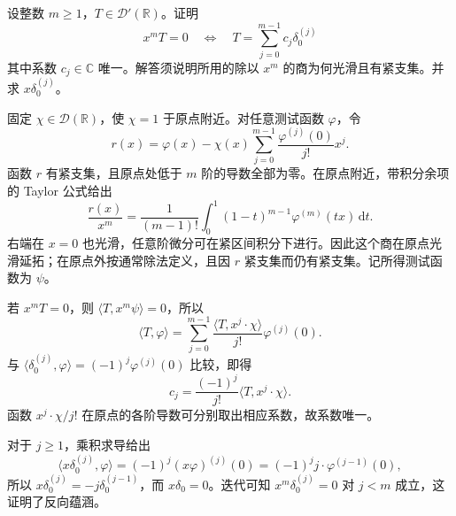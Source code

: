 \begin{optionalexercise}\label{b1:ex:20-polynomial-annihilator}
设整数 \(m\ge1\)，\(T\in\mathcal D'(\mathbb R)\)。证明
\[
 x^mT=0
 \quad\Longleftrightarrow\quad
 T=\sum_{j=0}^{m-1}c_j\delta_0^{(j)}
\]
其中系数 \(c_j\in\mathbb C\) 唯一。解答须说明所用的除以 \(x^m\) 的商为何光滑且有紧支集。并求 \(x\delta_0^{(j)}\)。
\end{optionalexercise}
\begin{solution}
固定 \(\chi\in\mathcal D(\mathbb R)\)，使 \(\chi=1\) 于原点附近。对任意测试函数 \(\varphi\)，令
\[
 r(x)=\varphi(x)-\chi(x)\sum_{j=0}^{m-1}\frac{\varphi^{(j)}(0)}{j!}x^j.
\]
函数 \(r\) 有紧支集，且原点处低于 \(m\) 阶的导数全部为零。在原点附近，带积分余项的 Taylor 公式给出
\[
 \frac{r(x)}{x^m}
 =\frac1{(m-1)!}\int_0^1(1-t)^{m-1}\varphi^{(m)}(tx)\,\mathrm dt.
\]
右端在 \(x=0\) 也光滑，任意阶微分可在紧区间积分下进行。因此这个商在原点光滑延拓；在原点外按通常除法定义，且因 \(r\) 紧支集而仍有紧支集。记所得测试函数为 \(\psi\)。

若 \(x^mT=0\)，则 \(\langle T,x^m\psi\rangle=0\)，所以
\[
 \langle T,\varphi\rangle
 =\sum_{j=0}^{m-1}\frac{\langle T,x^j\cdot \chi\rangle}{j!}\varphi^{(j)}(0).
\]
与 \(\langle\delta_0^{(j)},\varphi\rangle=(-1)^j\varphi^{(j)}(0)\) 比较，即得
\[
 c_j=\frac{(-1)^j}{j!}\langle T,x^j\cdot \chi\rangle.
\]
函数 \(x^j\cdot \chi/j!\) 在原点的各阶导数可分别取出相应系数，故系数唯一。

对于 \(j\ge1\)，乘积求导给出
\[
 \langle x\delta_0^{(j)},\varphi\rangle
 =(-1)^j(x\varphi)^{(j)}(0)
 =(-1)^jj\cdot \varphi^{(j-1)}(0),
\]
所以 \(x\delta_0^{(j)}=-j\delta_0^{(j-1)}\)，而 \(x\delta_0=0\)。迭代可知 \(x^m\delta_0^{(j)}=0\) 对 \(j<m\) 成立，这证明了反向蕴涵。
\end{solution}

